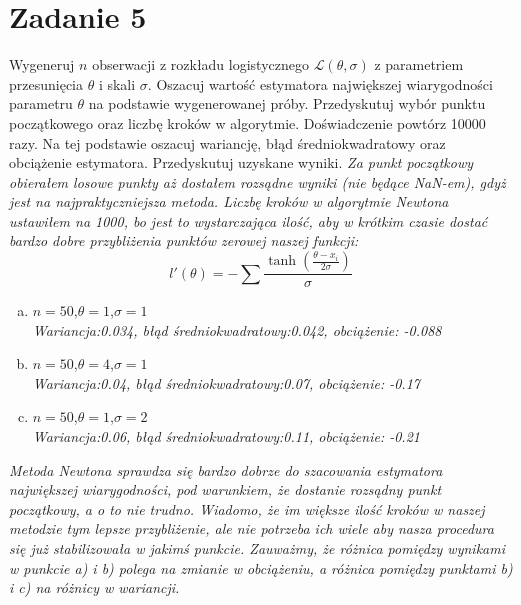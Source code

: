 \documentclass{memoir}
\begin{document}
\section*{Zadanie 5}
Wygeneruj $n$ obserwacji z rozkładu logistycznego $\mathcal{L}(\theta,\sigma)$ z parametriem przesunięcia $\theta$ i skali $\sigma$. Oszacuj wartość estymatora największej wiarygodności parametru $\theta$ na podstawie wygenerowanej próby. Przedyskutuj wybór punktu początkowego oraz liczbę kroków w algorytmie. Doświadczenie powtórz 10000 razy. Na tej podstawie oszacuj wariancję, błąd średniokwadratowy oraz obciążenie estymatora. Przedyskutuj uzyskane wyniki.
\textit{Za punkt początkowy obierałem losowe punkty aż dostałem rozsądne wyniki (nie będące NaN-em), gdyż jest na najpraktyczniejsza metoda. Liczbę kroków w algorytmie Newtona ustawiłem na 1000, bo jest to wystarczająca ilość, aby w krótkim czasie dostać bardzo dobre przybliżenia punktów zerowej naszej funkcji:} $$l'(\theta)=-\sum \frac{\tanh \left( \frac{\theta-x_i}{2\sigma} \right)}{\sigma} $$
\begin{enumerate}[a)]
\item $n=50$,$\theta=1$,$\sigma=1$\\
\textit{Wariancja:0.034, błąd średniokwadratowy:0.042, obciążenie: -0.088}
\item $n=50$,$\theta=4$,$\sigma=1$\\
\textit{Wariancja:0.04, błąd średniokwadratowy:0.07, obciążenie: -0.17}
\item $n=50$,$\theta=1$,$\sigma=2$\\
\textit{Wariancja:0.06, błąd średniokwadratowy:0.11, obciążenie: -0.21}
\end{enumerate}
\textit{Metoda Newtona sprawdza się bardzo dobrze do szacowania estymatora największej wiarygodności, pod warunkiem, że dostanie rozsądny punkt początkowy, a o to nie trudno. Wiadomo, że im większe ilość kroków w naszej metodzie tym lepsze przybliżenie, ale nie potrzeba ich wiele aby nasza procedura się już stabilizowała w jakimś punkcie. Zauważmy, że różnica pomiędzy wynikami w punkcie a) i b) polega na zmianie w obciążeniu, a różnica pomiędzy punktami b) i c) na różnicy w wariancji.  }
\end{document}

